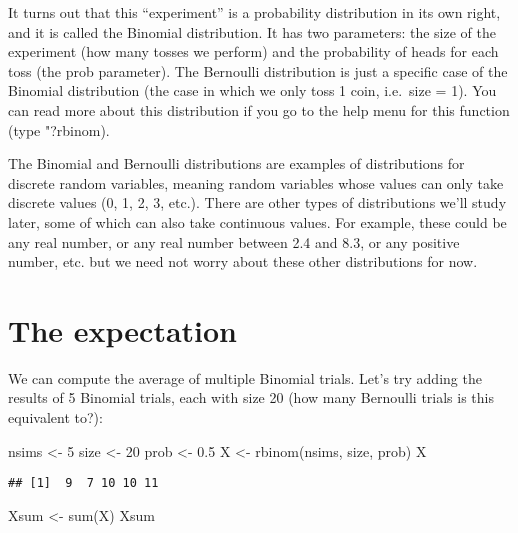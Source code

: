 \documentclass[
]{book}
\newenvironment{Shaded}{\begin{snugshade}}{\end{snugshade}}
\newcommand{\DecValTok}[1]{\textcolor[rgb]{0.00,0.00,0.81}{#1}}
\newcommand{\FloatTok}[1]{\textcolor[rgb]{0.00,0.00,0.81}{#1}}
\newcommand{\FunctionTok}[1]{\textcolor[rgb]{0.00,0.00,0.00}{#1}}
\newcommand{\NormalTok}[1]{#1}
\newcommand{\OtherTok}[1]{\textcolor[rgb]{0.56,0.35,0.01}{#1}}
\begin{document}
It turns out that this ``experiment'' is a probability distribution in its own right, and it is called the Binomial distribution. It has two parameters: the size of the experiment (how many tosses we perform) and the probability of heads for each toss (the prob parameter). The Bernoulli distribution is just a specific case of the Binomial distribution (the case in which we only toss 1 coin, i.e.~size = 1). You can read more about this distribution if you go to the help menu for this function (type "?rbinom).

The Binomial and Bernoulli distributions are examples of distributions for discrete random variables, meaning random variables whose values can only take discrete values (0, 1, 2, 3, etc.). There are other types of distributions we'll study later, some of which can also take continuous values. For example, these could be any real number, or any real number between 2.4 and 8.3, or any positive number, etc. but we need not worry about these other distributions for now.

\hypertarget{the-expectation}{%
\section{The expectation}\label{the-expectation}}

We can compute the average of multiple Binomial trials. Let's try adding the results of 5 Binomial trials, each with size 20 (how many Bernoulli trials is this equivalent to?):

\begin{Shaded}
\begin{Highlighting}[]
\NormalTok{nsims }\OtherTok{\textless{}{-}} \DecValTok{5}
\NormalTok{size }\OtherTok{\textless{}{-}} \DecValTok{20}
\NormalTok{prob }\OtherTok{\textless{}{-}} \FloatTok{0.5}
\NormalTok{X }\OtherTok{\textless{}{-}} \FunctionTok{rbinom}\NormalTok{(nsims, size, prob)}
\NormalTok{X}
\end{Highlighting}
\end{Shaded}

\begin{verbatim}
## [1]  9  7 10 10 11
\end{verbatim}

\begin{Shaded}
\begin{Highlighting}[]
\NormalTok{Xsum }\OtherTok{\textless{}{-}} \FunctionTok{sum}\NormalTok{(X)}
\NormalTok{Xsum}
\end{Highlighting}
\end{Shaded}
\end{document}
